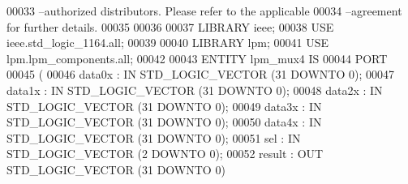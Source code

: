 \begin{DoxyCode}
{00033 \textcolor{keyword}{--authorized distributors.  Please refer to the applicable }
00034 \textcolor{keyword}{--agreement for further details.}
00035 
00036 
00037 \textcolor{vhdlkeyword}{LIBRARY }\textcolor{keywordflow}{ieee};
00038 \textcolor{vhdlkeyword}{USE }ieee.std\_logic\_1164.\textcolor{keywordflow}{all};
00039 
00040 \textcolor{vhdlkeyword}{LIBRARY }\textcolor{keywordflow}{lpm};
00041 \textcolor{vhdlkeyword}{USE }lpm.lpm\_components.\textcolor{keywordflow}{all};
00042 
00043 \textcolor{keywordflow}{ENTITY }lpm_mux4 \textcolor{keywordflow}{IS}
00044     \textcolor{keywordflow}{PORT}
00045     \textcolor{vhdlchar}{(}
00046         \textcolor{vhdlchar}{data0x}      \textcolor{vhdlchar}{:} \textcolor{keywordflow}{IN} \textcolor{comment}{STD\_LOGIC\_VECTOR} \textcolor{vhdlchar}{(}\textcolor{vhdllogic}{}\textcolor{vhdllogic}{31} \textcolor{keywordflow}{DOWNTO} \textcolor{vhdllogic}{}\textcolor{vhdllogic}{0}\textcolor{vhdlchar}{)};
00047         \textcolor{vhdlchar}{data1x}      \textcolor{vhdlchar}{:} \textcolor{keywordflow}{IN} \textcolor{comment}{STD\_LOGIC\_VECTOR} \textcolor{vhdlchar}{(}\textcolor{vhdllogic}{}\textcolor{vhdllogic}{31} \textcolor{keywordflow}{DOWNTO} \textcolor{vhdllogic}{}\textcolor{vhdllogic}{0}\textcolor{vhdlchar}{)};
00048         \textcolor{vhdlchar}{data2x}      \textcolor{vhdlchar}{:} \textcolor{keywordflow}{IN} \textcolor{comment}{STD\_LOGIC\_VECTOR} \textcolor{vhdlchar}{(}\textcolor{vhdllogic}{}\textcolor{vhdllogic}{31} \textcolor{keywordflow}{DOWNTO} \textcolor{vhdllogic}{}\textcolor{vhdllogic}{0}\textcolor{vhdlchar}{)};
00049         \textcolor{vhdlchar}{data3x}      \textcolor{vhdlchar}{:} \textcolor{keywordflow}{IN} \textcolor{comment}{STD\_LOGIC\_VECTOR} \textcolor{vhdlchar}{(}\textcolor{vhdllogic}{}\textcolor{vhdllogic}{31} \textcolor{keywordflow}{DOWNTO} \textcolor{vhdllogic}{}\textcolor{vhdllogic}{0}\textcolor{vhdlchar}{)};
00050         \textcolor{vhdlchar}{data4x}      \textcolor{vhdlchar}{:} \textcolor{keywordflow}{IN} \textcolor{comment}{STD\_LOGIC\_VECTOR} \textcolor{vhdlchar}{(}\textcolor{vhdllogic}{}\textcolor{vhdllogic}{31} \textcolor{keywordflow}{DOWNTO} \textcolor{vhdllogic}{}\textcolor{vhdllogic}{0}\textcolor{vhdlchar}{)};
00051         \textcolor{vhdlchar}{sel}     \textcolor{vhdlchar}{:} \textcolor{keywordflow}{IN} \textcolor{comment}{STD\_LOGIC\_VECTOR} \textcolor{vhdlchar}{(}\textcolor{vhdllogic}{}\textcolor{vhdllogic}{2} \textcolor{keywordflow}{DOWNTO} \textcolor{vhdllogic}{}\textcolor{vhdllogic}{0}\textcolor{vhdlchar}{)};
00052         \textcolor{vhdlchar}{result}      \textcolor{vhdlchar}{:} \textcolor{keywordflow}{OUT} \textcolor{comment}{STD\_LOGIC\_VECTOR} \textcolor{vhdlchar}{(}\textcolor{vhdllogic}{}\textcolor{vhdllogic}{31} \textcolor{keywordflow}{DOWNTO} \textcolor{vhdllogic}{}\textcolor{vhdllogic}{0}\textcolor{vhdlchar}{)}
}
\end{DoxyCode}
